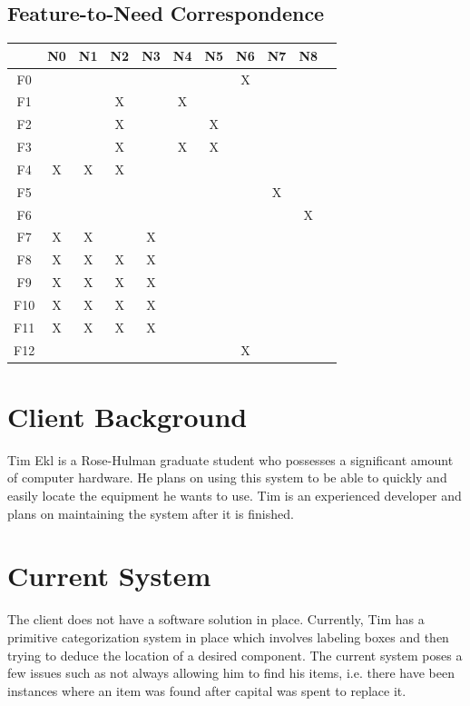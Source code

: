 \documentclass{article}
\begin{document}
\subsection{Feature-to-Need Correspondence}
\begin{tabular}{ | c || c | c | c | c | c | c | c | c | c | c | }
\hline
    & N0 & N1 & N2 & N3 & N4 & N5 & N6 & N7 & N8 \\
\hline
\hline
F0  &    &    &    &    &    &    & X  &    &    \\
\hline
F1  &    &    & X  &    & X  &    &    &    &    \\
\hline
F2  &    &    & X  &    &    & X  &    &    &    \\
\hline
F3  &    &    & X  &    & X  & X  &    &    &    \\
\hline
F4  & X  & X  & X  &    &    &    &    &    &    \\
\hline
F5  &    &    &    &    &    &    &    & X  &    \\
\hline
F6  &    &    &    &    &    &    &    &    & X  \\
\hline
F7  & X  & X  &    & X  &    &    &    &    &    \\
\hline
F8  & X  & X  & X  & X  &    &    &    &    &    \\
\hline
F9  & X  & X  & X  & X  &    &    &    &    &    \\
\hline
F10 & X  & X  & X  & X  &    &    &    &    &    \\
\hline
F11 & X  & X  & X  & X  &    &    &    &    &    \\
\hline
F12 &    &    &    &    &    &    & X  &    &    \\
\hline
\end{tabular}

\section{Client Background}
Tim Ekl is a Rose-Hulman graduate student who possesses a significant amount of computer hardware.  He plans on using this system to be able to quickly and easily locate the equipment he wants to use.  Tim is an experienced developer and plans on maintaining the system after it is finished.  

\section{Current System}
The client does not have a software solution in place.  Currently, Tim has a primitive categorization system in place which involves labeling boxes and then trying to deduce the location of a desired component.  The current system poses a few issues such as not always allowing him to find his items, i.e. there have been instances where an item was found after capital was spent to replace it.
\end{document}
